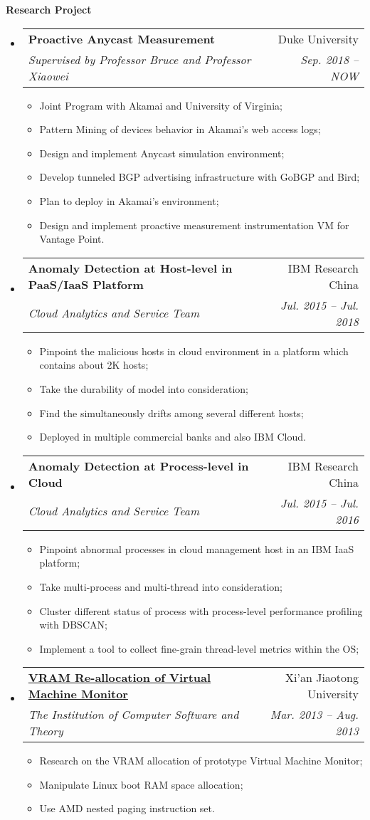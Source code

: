 \documentclass[letterpaper,11pt]{article}
\makeatletter
\newcommand{\resitem}[1]{\item #1 \vspace{-2pt}}
\newcommand{\resheading}[1]{{\large \colorbox{mygrey}{\begin{minipage}{\textwidth}{\textbf{#1 \vphantom{p\^{E}}}}\end{minipage}}}}
\newcommand{\ressubheading}[4]{
\begin{tabular*}{6.5in}{l@{\extracolsep{\fill}}r}
		\textbf{#1} & #2 \\
		\textit{#3} & \textit{#4} \\
\end{tabular*}\vspace{-6pt}}
\makeatother
\begin{document}
\resheading{Research Project}
	\begin{itemize}
			\item 
			\ressubheading{Proactive Anycast Measurement}{Duke University}{Supervised by Professor Bruce and Professor Xiaowei}{Sep. 2018 -- NOW}
				{ \footnotesize
				\begin{itemize}
				    \resitem{Joint Program with Akamai and University of Virginia;}
					\resitem{Pattern Mining of devices behavior in Akamai's web access logs;}
					\resitem{Design and implement Anycast simulation environment;}
					\resitem{Develop tunneled BGP advertising infrastructure with GoBGP and Bird;}
					\resitem{Plan to deploy in Akamai's environment;}
					\resitem{Design and implement proactive measurement instrumentation VM for Vantage Point.}
				\end{itemize}
				}
		\item 
			\ressubheading{Anomaly Detection at Host-level in PaaS/IaaS Platform}{IBM Research China}{Cloud Analytics and Service Team}{Jul. 2015 -- Jul. 2018}
				{ \footnotesize
				\begin{itemize}
					\resitem{Pinpoint the malicious hosts in cloud environment in a platform which contains about 2K hosts;}
					\resitem{Take the durability of model into consideration;}
					\resitem{Find the simultaneously drifts among several different hosts;}
					\resitem{Deployed in multiple commercial banks and also IBM Cloud.}
				\end{itemize}
				}
		\item 
			\ressubheading{Anomaly Detection at Process-level in Cloud}{IBM Research China}{Cloud Analytics and Service Team}{Jul. 2015 -- Jul. 2016}
				{ \footnotesize
				\begin{itemize}
					\resitem{Pinpoint abnormal processes in cloud management host in an IBM IaaS platform;}
					\resitem{Take multi-process and multi-thread into consideration;}
					\resitem{Cluster different status of process with process-level performance profiling with DBSCAN;}
					\resitem{Implement a tool to collect fine-grain thread-level metrics within the OS;}
				\end{itemize}
				}
		\item 
			\ressubheading{\href{http://eiegrd.xjtu.edu.cn/}{VRAM Re-allocation of Virtual Machine Monitor}}{Xi'an Jiaotong University}{The Institution of Computer Software and Theory}{Mar. 2013 -- Aug. 2013}
				{ \footnotesize
				\begin{itemize}
					\resitem{Research on the VRAM allocation of prototype Virtual Machine Monitor;}
					\resitem{Manipulate Linux boot RAM space allocation;}
					\resitem{Use AMD nested paging instruction set.}
				\end{itemize}
				}
	\end{itemize}	
\end{document}
